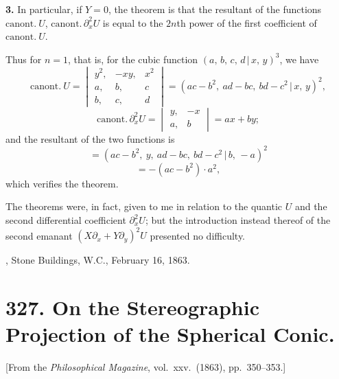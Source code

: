 \documentclass[11pt,a4paper]{article}
\theoremstyle{plain}
\begin{document}
\medskip

\noindent\textbf{3.} In particular, if $Y = 0$, the theorem is that the resultant of the functions $\text{canont.}\ U$, $\text{canont.}\,\partial_x^2 U$ is equal to the $2n$th power of the first coefficient of $\text{canont.}\ U$.

Thus for $n = 1$, that is, for the cubic function $(a,\,b,\,c,\,d \,\vert\, x,\,y)^3$, we have
\[
\text{canont.}\ U = \begin{vmatrix} y^2, & -xy, & x^2 \\ a, & b, & c \\ b, & c, & d \end{vmatrix} = (ac - b^2,\ ad - bc,\ bd - c^2 \,\vert\, x,\,y)^2,
\]
\[
\text{canont.}\,\partial_x^2 U = \begin{vmatrix} y, & -x \\ a, & b \end{vmatrix} = ax + by;
\]
and the resultant of the two functions is
\[
= (ac - b^2,\ y,\ ad - bc,\ bd - c^2 \,\vert\, b,\,-a)^2
\]
\[
= -(ac - b^2)\cdot a^2,
\]
which verifies the theorem.

The theorems were, in fact, given to me in relation to the quantic $U$ and the second differential coefficient $\partial_x^2 U$; but the introduction instead thereof of the second emanant $(X\partial_x + Y\partial_y)^2 U$ presented no difficulty.

\medskip
{}, Stone Buildings, W.C., February 16, 1863.


\newpage
\section*{327. On the Stereographic Projection of the Spherical Conic.}

[From the \textit{Philosophical Magazine}, vol.\ xxv.\ (1863), pp.\ 350--353.]

\medskip
\end{document}
